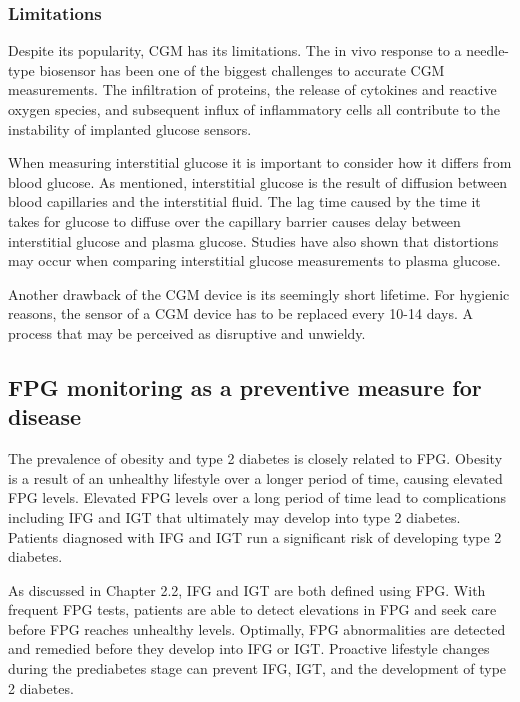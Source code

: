 \documentclass[english, 12pt, a4paper, elec, utf8, a-1b, online]{aaltothesis}
\begin{document}
\subsubsection{Limitations}
Despite its popularity, CGM has its limitations. The in vivo response to a needle-type biosensor has
been one of the biggest challenges to accurate CGM measurements. The infiltration
of proteins, the release of cytokines and reactive oxygen species, and subsequent
influx of inflammatory cells all contribute to the instability of implanted glucose sensors\cite{gifford_cgm}. 

When measuring interstitial glucose it is important to consider how it differs from blood glucose. As mentioned, interstitial 
glucose is the result of diffusion between blood capillaries and the interstitial fluid. The lag time caused by 
the time it takes for glucose to diffuse over the capillary barrier
causes delay between interstitial glucose and plasma glucose. Studies have also shown that 
distortions may occur when comparing interstitial glucose measurements to plasma glucose\cite{cobelli_interstitial_2016}. 

Another drawback of the CGM device is its seemingly short lifetime. For hygienic reasons, the sensor of a CGM device has to be replaced every 10-14 days.
A process that may be perceived as disruptive and unwieldy.

\subsection{FPG monitoring as a preventive measure for disease}
The prevalence of obesity and type 2 diabetes is closely related to FPG. Obesity is a result of an unhealthy lifestyle over a longer period of time,
causing elevated FPG levels\cite{garber_obesity_2012}. Elevated FPG levels over a long period of time lead to complications including IFG 
and IGT that ultimately may develop into type 2 diabetes. Patients diagnosed with IFG and IGT run a significant risk of developing type 2 diabetes\cite{nathan_impaired_2007}. 

As discussed in Chapter 2.2, IFG and IGT are both defined using FPG. With frequent FPG tests, patients are able to detect
elevations in FPG and seek care before FPG reaches unhealthy levels. Optimally, FPG abnormalities are detected and remedied before they develop into IFG or
IGT. Proactive lifestyle changes during the prediabetes stage can prevent IFG, IGT, and the development of type 2 diabetes\cite{taylor_type_2013}. 
\clearpage
\end{document}
